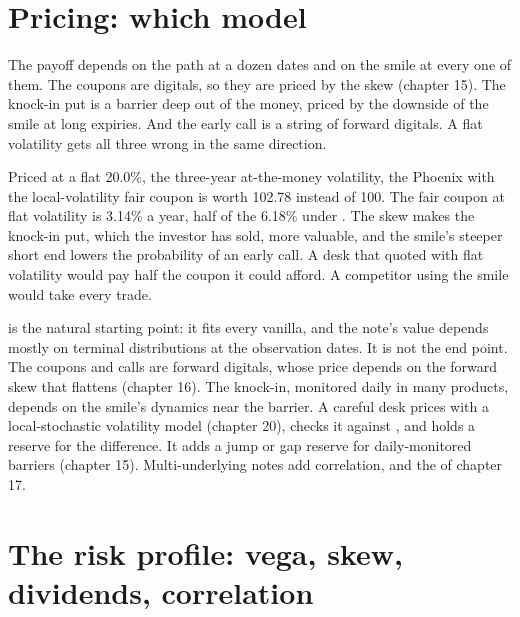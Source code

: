 \section{Pricing: which model}

The payoff depends on the path at a dozen dates and on the smile at every one of them. The coupons are digitals, so they are
priced by the skew (chapter 15). The knock-in put is a barrier deep out of the money, priced by the downside of the smile at
long expiries. And the early call is a string of forward digitals. A flat volatility gets all three wrong in the same
direction.

\begin{example}\label{ex:dv:autocallables:flat}
Priced at a flat 20.0\%, the three-year at-the-money volatility, the Phoenix with the local-volatility fair coupon is worth 102.78
instead of 100. The fair coupon at flat volatility is 3.14\% a year, half of the 6.18\% under . The skew makes
the knock-in put, which the investor has sold, more valuable, and the smile's steeper short end lowers the probability of an
early call. A desk that quoted with flat volatility would pay half the coupon it could afford. A competitor using the smile would
take every trade.
\end{example}

 is the natural starting point: it fits every vanilla, and the note's value depends mostly on terminal
distributions at the observation dates. It is not the end point. The coupons and calls are forward digitals, whose price
depends on the forward skew that  flattens (chapter 16). The knock-in, monitored daily in many products, depends
on the smile's dynamics near the barrier. A careful desk prices with a local-stochastic volatility model (chapter 20), checks it against , and holds a
reserve for the difference. It adds a jump or gap reserve for daily-monitored barriers (chapter 15). Multi-underlying notes add correlation, and the  of chapter 17.

\section{The risk profile: vega, skew, dividends, correlation}


